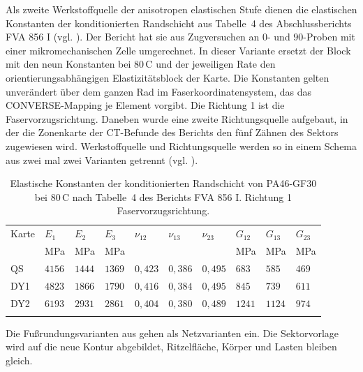 Als zweite Werkstoffquelle der anisotropen elastischen Stufe dienen die elastischen Konstanten der konditionierten Randschicht aus Tabelle~4 des Abschlussberichts FVA 856 I \cite{FVA856-I} (vgl. ). Der Bericht hat sie aus Zugversuchen an $0$\textdegree- und $90$\textdegree-Proben mit einer mikromechanischen Zelle umgerechnet. In dieser Variante ersetzt der Block mit den neun Konstanten bei $80$\,\textdegree C und der jeweiligen Rate den orientierungsabhängigen Elastizitätsblock der Karte. Die Konstanten gelten unverändert über dem ganzen Rad im Faserkoordinatensystem, das das CONVERSE-Mapping je Element vorgibt. Die Richtung 1 ist die Faservorzugsrichtung. Daneben wurde eine zweite Richtungsquelle aufgebaut, in der die Zonenkarte der CT-Befunde des Berichts den fünf Zähnen des Sektors zugewiesen wird. Werkstoffquelle und Richtungsquelle werden so in einem Schema aus zwei mal zwei Varianten getrennt (vgl. ).

\begin{table}[htbp]
	\caption{Elastische Konstanten der konditionierten Randschicht von PA46-GF30 bei $80$\,\textdegree C nach Tabelle~4 des Berichts FVA 856 I. Richtung 1 Faservorzugsrichtung.}
	\label{tab:fva856_tab4}
	\centering
	\small
	\begin{tabular}{llllllllll}
		\hline
		Karte & $E_{1}$ & $E_{2}$ & $E_{3}$ & $\nu_{12}$ & $\nu_{13}$ & $\nu_{23}$ & $G_{12}$ & $G_{13}$ & $G_{23}$ \\
		      & MPa     & MPa     & MPa     &            &            &            & MPa      & MPa      & MPa      \\
		\hline
		\arrayrulecolor{black!30}
		QS    & $4156$  & $1444$  & $1369$  & $0{,}423$  & $0{,}386$  & $0{,}495$  & $683$    & $585$    & $469$    \\
		\hline
		DY1   & $4823$  & $1866$  & $1790$  & $0{,}416$  & $0{,}384$  & $0{,}495$  & $845$    & $739$    & $611$    \\
		\hline
		DY2   & $6193$  & $2931$  & $2861$  & $0{,}404$  & $0{,}380$  & $0{,}489$  & $1241$   & $1124$   & $974$    \\
		\arrayrulecolor{black}
		\hline
	\end{tabular}
\end{table}

Die Fußrundungsvarianten aus  gehen als Netzvarianten ein. Die Sektorvorlage wird auf die neue Kontur abgebildet, Ritzelfläche, Körper und Lasten bleiben gleich.

